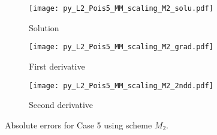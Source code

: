 \documentclass[review,3p]{elsarticle}
\begin{document}
\begin{figure}[!ht]
    \begin{subfigure}{5.5cm}
        \texttt{[image: py\_L2\_Pois5\_MM\_scaling\_M2\_solu.pdf]}
        \caption{Solution}
        \label{py_L2_Pois5_MM_scaling_M2_solu}
    \end{subfigure}
    \hspace{-0.2cm}
    \begin{subfigure}{5.5cm}
        \texttt{[image: py\_L2\_Pois5\_MM\_scaling\_M2\_grad.pdf]}
        \caption{First derivative}
        \label{py_L2_Pois5_MM_scaling_M2_grad}
    \end{subfigure}
    \hspace{-0.2cm}
    \begin{subfigure}{5.5cm}
        \texttt{[image: py\_L2\_Pois5\_MM\_scaling\_M2\_2ndd.pdf]}
        \caption{Second derivative}
        \label{py_L2_Pois5_MM_scaling_M2_2ndd}
    \end{subfigure}
\caption{Absolute errors for Case 5 using scheme $M_2$.}
\label{py_L2_Pois5_MM_scaling_M2}
\end{figure}

% 
  
\end{document}
